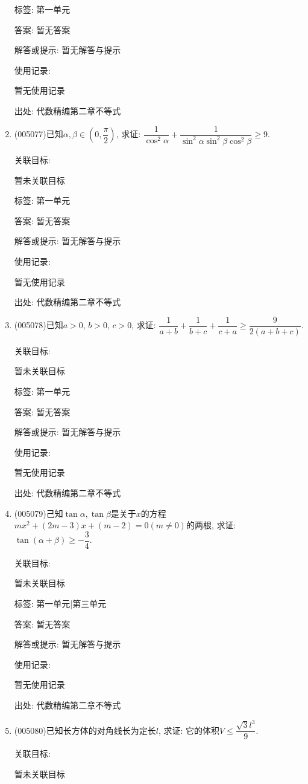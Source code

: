 \documentclass[10pt,a4paper]{article}
\begin{document}
\begin{enumerate}[1.]
标签: 第一单元

答案: 暂无答案

解答或提示: 暂无解答与提示

使用记录:

暂无使用记录


出处: 代数精编第二章不等式
\item { (005077)}已知$\alpha ,\beta \in (0,\dfrac{\pi}2)$, 求证: $\dfrac 1{\cos^2\alpha}+\dfrac 1{\sin^2\alpha \sin^2\beta\cos^2\beta}\ge 9$.


关联目标:

暂未关联目标



标签: 第一单元

答案: 暂无答案

解答或提示: 暂无解答与提示

使用记录:

暂无使用记录


出处: 代数精编第二章不等式
\item { (005078)}已知$a>0$, $b>0$, $c>0$, 求证: $\dfrac 1{a+b}+\dfrac 1{b+c}+\dfrac 1{c+a}\ge \dfrac 9{2(a+b+c)}$.


关联目标:

暂未关联目标



标签: 第一单元

答案: 暂无答案

解答或提示: 暂无解答与提示

使用记录:

暂无使用记录


出处: 代数精编第二章不等式
\item { (005079)}己知$\tan \alpha,\tan \beta$是关于$x$的方程$mx^2+(2m-3)x+(m-2)=0(m\ne 0)$的两根, 求证: $\tan (\alpha +\beta)\ge -\dfrac 34$.


关联目标:

暂未关联目标



标签: 第一单元|第三单元

答案: 暂无答案

解答或提示: 暂无解答与提示

使用记录:

暂无使用记录


出处: 代数精编第二章不等式
\item { (005080)}已知长方体的对角线长为定长$l$, 求证: 它的体积$V\le \dfrac{\sqrt 3l^3}9$.


关联目标:

暂未关联目标




\end{enumerate}
\end{document}
